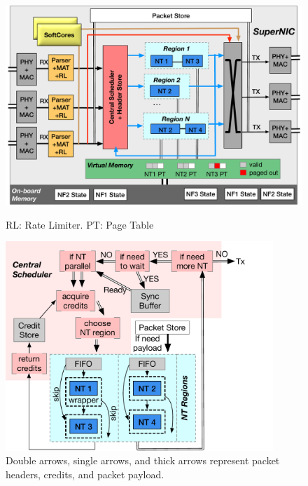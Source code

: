 {
\begin{figure}[th]
\begin{center}
\centerline{\includegraphics[width=\textwidth]{snic/Figures/board.pdf}}
{
RL: Rate Limiter. PT: Page Table
}
\end{center}
\end{figure}
}
{
\begin{figure}[th]
\begin{center}
\includegraphics[width=0.9\textwidth]{snic/Figures/scheduler.pdf}
{
Double arrows, single arrows, and thick arrows represent packet headers, credits, and packet payload.
}
\end{center}
\end{figure}
}